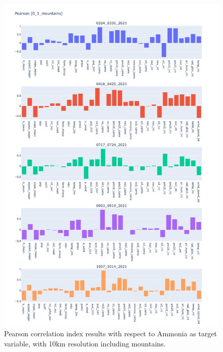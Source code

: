 \begin{figure}[H]
    \centering
    \includegraphics[scale=0.35]{images/tests/0_1_mountainsnh3_st_pearson.png}
    \caption{Pearson correlation index results with respect to Ammonia as target variable, with 10km resolution including mountains.}
    \label{fig:overview}
\end{figure}
